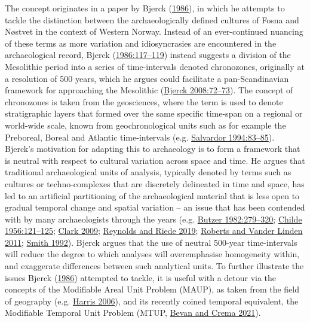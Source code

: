\documentclass[
  12pt,
  a4paper,
  oneside]{book}
\begin{document}
The concept originates in a paper by Bjerck (\protect\hyperlink{ref-bjerck1986}{1986}), in which he attempts to tackle the distinction between the archaeologically defined cultures of Fosna and Nøstvet in the context of Western Norway. Instead of an ever-continued nuancing of these terms as more variation and idiosyncrasies are encountered in the archaeological record, Bjerck (\protect\hyperlink{ref-bjerck1986}{1986:117--119}) instead suggests a division of the Mesolithic period into a series of time-intervals denoted chronozones, originally at a resolution of 500 years, which he argues could facilitate a pan-Scandinavian framework for approaching the Mesolithic (\protect\hyperlink{ref-bjerck2008}{Bjerck 2008:72--73}). The concept of chronozones is taken from the geosciences, where the term is used to denote stratigraphic layers that formed over the same specific time-span on a regional or world-wide scale, known from geochronological units such as for example the Preboreal, Boreal and Atlantic time-intervals (e.g. \protect\hyperlink{ref-salvador1994}{Salvardor 1994:83--85}). Bjerck's motivation for adapting this to archaeology is to form a framework that is neutral with respect to cultural variation across space and time. He argues that traditional archaeological units of analysis, typically denoted by terms such as cultures or techno-complexes that are discretely delineated in time and space, has led to an artificial partitioning of the archaeological material that is less open to gradual temporal change and spatial variation -- an issue that has been contended with by many archaeologists through the years (e.g. \protect\hyperlink{ref-butzer1982}{Butzer 1982:279--320}; \protect\hyperlink{ref-childe1956}{Childe 1956:121--125}; \protect\hyperlink{ref-clark2009}{Clark 2009}; \protect\hyperlink{ref-reynolds2019}{Reynolds and Riede 2019}; \protect\hyperlink{ref-roberts2011}{Roberts and Vander Linden 2011}; \protect\hyperlink{ref-smith1992}{Smith 1992}). Bjerck argues that the use of neutral 500-year time-intervals will reduce the degree to which analyses will overemphasise homogeneity within, and exaggerate differences between such analytical units. To further illustrate the issues Bjerck (\protect\hyperlink{ref-bjerck1986}{1986}) attempted to tackle, it is useful with a detour via the concepts of the Modifiable Areal Unit Problem (MAUP), as taken from the field of geography (e.g. \protect\hyperlink{ref-harris2006}{Harris 2006}), and its recently coined temporal equivalent, the Modifiable Temporal Unit Problem (MTUP, \protect\hyperlink{ref-bevan2021}{Bevan and Crema 2021}).
\end{document}
